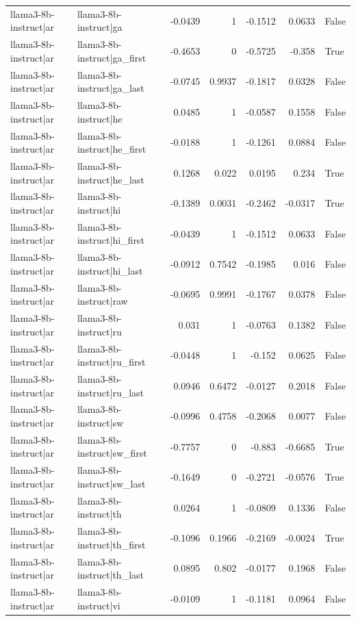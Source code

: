 \begin{table}
\begin{tabular}{l l r r r r l}
llama3-8b-instruct|ar & llama3-8b-instruct|ga & -0.0439 & 1 & -0.1512 & 0.0633 & False \\
llama3-8b-instruct|ar & llama3-8b-instruct|ga_first & -0.4653 & 0 & -0.5725 & -0.358 & True \\
llama3-8b-instruct|ar & llama3-8b-instruct|ga_last & -0.0745 & 0.9937 & -0.1817 & 0.0328 & False \\
llama3-8b-instruct|ar & llama3-8b-instruct|he & 0.0485 & 1 & -0.0587 & 0.1558 & False \\
llama3-8b-instruct|ar & llama3-8b-instruct|he_first & -0.0188 & 1 & -0.1261 & 0.0884 & False \\
llama3-8b-instruct|ar & llama3-8b-instruct|he_last & 0.1268 & 0.022 & 0.0195 & 0.234 & True \\
llama3-8b-instruct|ar & llama3-8b-instruct|hi & -0.1389 & 0.0031 & -0.2462 & -0.0317 & True \\
llama3-8b-instruct|ar & llama3-8b-instruct|hi_first & -0.0439 & 1 & -0.1512 & 0.0633 & False \\
llama3-8b-instruct|ar & llama3-8b-instruct|hi_last & -0.0912 & 0.7542 & -0.1985 & 0.016 & False \\
llama3-8b-instruct|ar & llama3-8b-instruct|raw & -0.0695 & 0.9991 & -0.1767 & 0.0378 & False \\
llama3-8b-instruct|ar & llama3-8b-instruct|ru & 0.031 & 1 & -0.0763 & 0.1382 & False \\
llama3-8b-instruct|ar & llama3-8b-instruct|ru_first & -0.0448 & 1 & -0.152 & 0.0625 & False \\
llama3-8b-instruct|ar & llama3-8b-instruct|ru_last & 0.0946 & 0.6472 & -0.0127 & 0.2018 & False \\
llama3-8b-instruct|ar & llama3-8b-instruct|sw & -0.0996 & 0.4758 & -0.2068 & 0.0077 & False \\
llama3-8b-instruct|ar & llama3-8b-instruct|sw_first & -0.7757 & 0 & -0.883 & -0.6685 & True \\
llama3-8b-instruct|ar & llama3-8b-instruct|sw_last & -0.1649 & 0 & -0.2721 & -0.0576 & True \\
llama3-8b-instruct|ar & llama3-8b-instruct|th & 0.0264 & 1 & -0.0809 & 0.1336 & False \\
llama3-8b-instruct|ar & llama3-8b-instruct|th_first & -0.1096 & 0.1966 & -0.2169 & -0.0024 & True \\
llama3-8b-instruct|ar & llama3-8b-instruct|th_last & 0.0895 & 0.802 & -0.0177 & 0.1968 & False \\
llama3-8b-instruct|ar & llama3-8b-instruct|vi & -0.0109 & 1 & -0.1181 & 0.0964 & False \\

\end{tabular}
\end{table}
